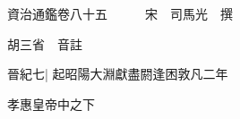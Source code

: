 






























































資治通鑑卷八十五　　　宋　司馬光　撰

胡三省　音註

晉紀七|{
	起昭陽大淵獻盡閼逢困敦凡二年}


孝惠皇帝中之下

